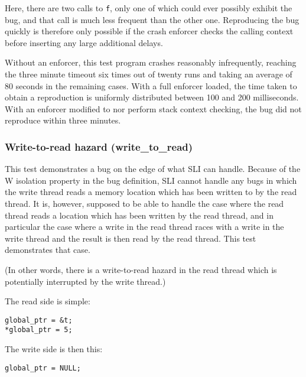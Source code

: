 Here, there are two calls to \verb|f|, only one of which could ever
possibly exhibit the bug, and that call is much less frequent than the
other one.  Reproducing the bug quickly is therefore only possible if
the crash enforcer checks the calling context before inserting any
large additional delays.

Without an enforcer, this test program crashes reasonably
infrequently, reaching the three minute timeout six times out of
twenty runs and taking an average of 80 seconds in the remaining
cases.  With a full
enforcer loaded, the time taken to obtain a reproduction is uniformly
distributed between 100 and 200 milliseconds.  With an enforcer
modified to nor perform stack context checking, the bug did not
reproduce within three minutes.


\subsubsection{Write-to-read hazard (write\_to\_read)}

This test demonstrates a bug on the edge of what SLI can handle.
Because of the W isolation property in the bug definition, SLI cannot
handle any bugs in which the write thread reads a memory location
which has been written to by the read thread.  It is, however,
supposed to be able to handle the case where the read thread reads a
location which has been written by the read thread, and in particular
the case where a write in the read thread races with a write in the
write thread and the result is then read by the read thread.  This
test demonstrates that case.

(In other words, there is a write-to-read hazard in the read thread
which is potentially interrupted by the write thread.)

The read side is simple:

\begin{verbatim}
global_ptr = &t;
*global_ptr = 5;
\end{verbatim}

The write side is then this:

\begin{verbatim}
global_ptr = NULL;
\end{verbatim}

